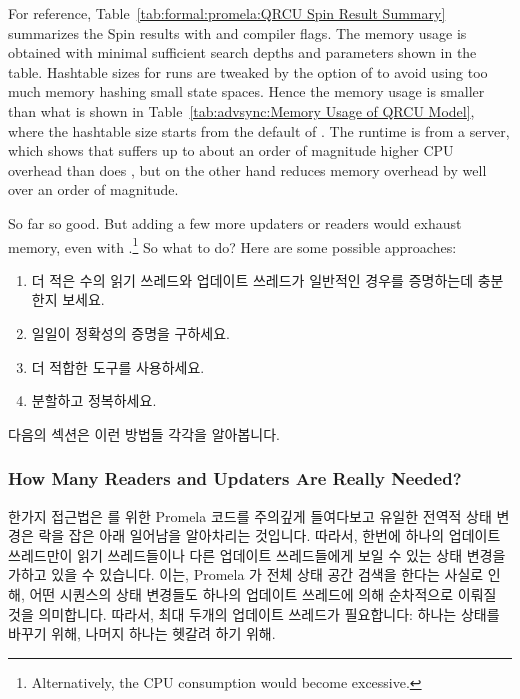 For reference, Table~\ref{tab:formal:promela:QRCU Spin Result Summary}
summarizes the Spin results with  and 
compiler flags.
The memory usage is obtained with minimal sufficient
search depths and  parameters shown in the table.
Hashtable sizes for  runs are tweaked by
the  option of  to avoid using too much
memory hashing small state spaces.
Hence the memory usage is smaller than what is shown in
Table~\ref{tab:advsync:Memory Usage of QRCU Model}, where the
hashtable size starts from the default of .
The runtime is from a  server, which shows that 
suffers up to about an order of magnitude higher CPU overhead
than does , but on the other hand reduces memory overhead
by well over an order of magnitude.

So far so good.
But adding a few more updaters or readers would exhaust memory, even
with .\footnote{
	Alternatively, the CPU consumption would become excessive.}
So what to do?
Here are some possible approaches:
\fi

\begin{enumerate}
\item	더 적은 수의 읽기 쓰레드와 업데이트 쓰레드가 일반적인 경우를 증명하는데
	충분한지 보세요.
\item	일일이 정확성의 증명을 구하세요.
\item	더 적합한 도구를 사용하세요.
\item	분할하고 정복하세요.
\iffalse

\item	See whether a smaller number of readers and updaters suffice
	to prove the general case.
\item	Manually construct a proof of correctness.
\item	Use a more capable tool.
\item	Divide and conquer.
\fi
\end{enumerate}

다음의 섹션은 이런 방법들 각각을 알아봅니다.
\iffalse

The following sections discuss each of these approaches.
\fi

\subsubsection{How Many Readers and Updaters Are Really Needed?}
\label{sec:formal:How Many Readers and Updaters Are Really Needed?}

한가지 접근법은  를 위한 Promela 코드를 주의깊게 들여다보고
유일한 전역적 상태 변경은 락을 잡은 아래 일어남을 알아차리는 것입니다.
따라서, 한번에 하나의 업데이트 쓰레드만이 읽기 쓰레드들이나 다른 업데이트
쓰레드들에게 보일 수 있는 상태 변경을 가하고 있을 수 있습니다.
이는, Promela 가 전체 상태 공간 검색을 한다는 사실로 인해, 어떤 시퀀스의 상태
변경들도 하나의 업데이트 쓰레드에 의해 순차적으로 이뤄질 것을 의미합니다.
따라서, 최대 두개의 업데이트 쓰레드가 필요합니다: 하나는 상태를 바꾸기 위해,
나머지 하나는 헷갈려 하기 위해.

